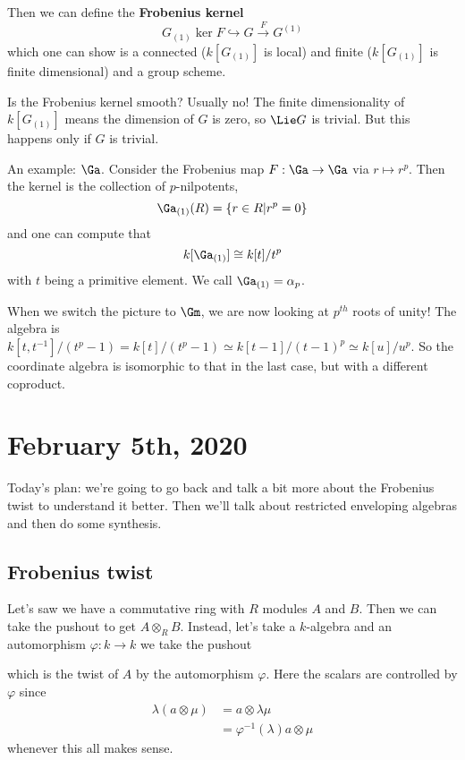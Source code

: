 \documentclass[12pt]{article}
\begin{document}
Then we can define the \textbf{Frobenius kernel}
\[G_{(1)}\ker F\hookrightarrow G\xrightarrow{F} G^{(1)}\]
which one can show is a connected ($k[G_{(1)}]$ is local) and finite ($k[G_{(1)}]$ is finite dimensional) and a group scheme.

Is the Frobenius kernel smooth? Usually no! The finite dimensionality of $k[G_{(1)}]$ means the dimension of $G$ is zero,
so $\Lie G$ is trivial. But this happens only if $G$ is trivial.

\brk

An example: $\Ga$. Consider the Frobenius map $F:\Ga\to \Ga$ via $r\mapsto r^p$. Then the kernel 
is the collection of $p$-nilpotents, 
\[{\Ga}_{(1)}(R)=\{r\in R|r^p=0\}\]
and one can compute that 
\[k[{\Ga}_{(1)}]\cong k[t]/t^p\]
with $t$ being a primitive element. We call ${\Ga}_{(1)}=\alpha_p$.

When we switch the picture to $\Gm$, we are now looking at $p^{th}$ roots of unity! The algebra is 
$k[t,t^{-1}]/(t^p-1)=k[t]/(t^p-1)\simeq k[t-1]/(t-1)^p\simeq k[u]/u^p$. So the coordinate algebra is isomorphic 
to that in the last case, but with a different coproduct.

\section{February 5th, 2020}
Today's plan: we're going to go back and talk a bit more about the Frobenius twist to understand it better.
Then we'll talk about restricted enveloping algebras and then do some synthesis.

\subsection{Frobenius twist}
Let's saw we have a commutative ring with $R$ modules $A$ and $B$. Then we can take the pushout to get $A\otimes_R B$. Instead, let's
take a $k$-algebra and an automorphism $\varphi:k\to k$ we take the pushout 
\begin{figure}[h]
	\centering
\end{figure}
which is the twist of $A$ by the automorphism $\varphi$. Here the scalars are controlled by $\varphi$ since 
\begin{align*}
	\lambda(a\otimes \mu)&= a\otimes \lambda\mu\\
	&=\varphi^{-1}(\lambda)a\otimes \mu
\end{align*}
whenever this all makes sense.
\end{document}
